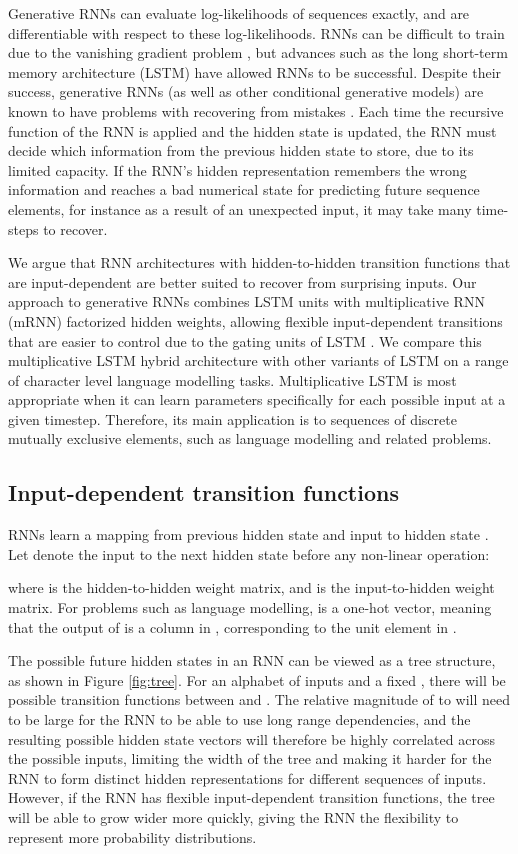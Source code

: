 \documentclass{article}
\begin{document}
Generative RNNs can evaluate log-likelihoods of sequences exactly, and are  differentiable with respect to these log-likelihoods. RNNs can be difficult to train due to the vanishing gradient problem \citep{Bengio-1994}, but advances such as the long short-term memory architecture (LSTM) \citep{Hochreiter-1997} have allowed RNNs to be successful. Despite their success, generative RNNs (as well as other conditional generative models) are known to have problems with recovering from mistakes \citep{Graves-2013}. Each time the recursive function of the RNN is applied and the hidden state is updated, the RNN must decide which information from the previous hidden state to store, due to its limited capacity. If the RNN's hidden representation remembers the wrong information and reaches a bad numerical state for predicting future sequence elements, for instance as a result of an unexpected input, it may take many time-steps to recover.    


We argue that RNN architectures with hidden-to-hidden transition functions that are input-dependent are better suited to recover from surprising inputs. Our approach to generative RNNs combines LSTM units with multiplicative RNN (mRNN) factorized hidden weights, allowing flexible input-dependent transitions that are easier to control due to the gating units of LSTM \@. We compare this multiplicative LSTM hybrid architecture with other variants of LSTM on a range of character level language modelling tasks. Multiplicative LSTM is most appropriate when it can learn parameters specifically for each possible input at a given timestep. Therefore, its main application is to sequences of discrete mutually exclusive elements, such as language modelling and related problems.

\subsection{Input-dependent transition functions}

RNNs learn a mapping from previous hidden state  and input  to hidden state . Let  denote the input to the next hidden state before any non-linear operation:

where   is the hidden-to-hidden weight matrix, and  is the input-to-hidden weight matrix. For problems such as language modelling,  is a one-hot vector, meaning that the output of  is a column in , corresponding to the unit element in .

The possible future hidden states in an RNN can be viewed as a tree structure, as shown in Figure \ref{fig:tree}. For an alphabet of  inputs and a fixed , there will be  possible transition functions between  and . The relative magnitude of  to  will need to be large for the RNN to be able to use long range dependencies, and the resulting possible hidden state vectors will therefore be highly correlated across the possible inputs, limiting the width of the tree and making it harder for the RNN to form distinct hidden representations for different sequences of inputs. However, if the RNN has flexible input-dependent transition functions,  the tree will be able to grow wider more quickly, giving the RNN the flexibility to represent more probability distributions.
\end{document}
